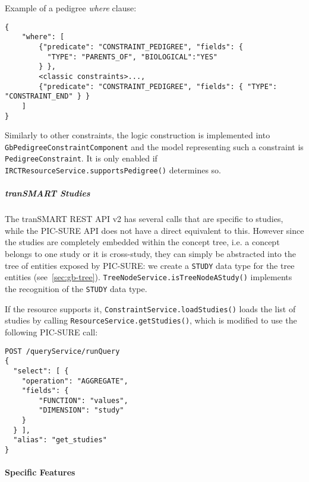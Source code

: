 Example of a pedigree \emph{where} clause:
\begin{verbatim}
{
    "where": [
        {"predicate": "CONSTRAINT_PEDIGREE", "fields": { 
          "TYPE": "PARENTS_OF", "BIOLOGICAL":"YES" 
        } },
        <classic constraints>..., 
        {"predicate": "CONSTRAINT_PEDIGREE", "fields": { "TYPE": "CONSTRAINT_END" } }
    ]
}
\end{verbatim}

Similarly to other constraints, the logic construction is implemented into \\
\verb|GbPedigreeConstraintComponent| and the model representing such a constraint is \verb|PedigreeConstraint|.
It is only enabled if \verb|IRCTResourceService.supportsPedigree()| determines so.


\subparagraph{tranSMART Studies}

The tranSMART REST API v2 has several calls that are specific to studies, while the PIC-SURE API does not have a direct equivalent to this.
However since the studies are completely embedded within the concept tree, i.e. a concept belongs to one study or it is cross-study, they can simply be abstracted into the tree of entities exposed by PIC-SURE: we create a \verb|STUDY| data type for the tree entities (see~\ref{sec:gb-tree}).
\verb|TreeNodeService.isTreeNodeAStudy()| implements the recognition of the \verb|STUDY| data type.

If the resource supports it, \verb|ConstraintService.loadStudies()| loads the list of studies by calling \verb|ResourceService.getStudies()|, which is modified to use the following PIC-SURE call:
\begin{verbatim}
POST /queryService/runQuery
{
  "select": [ {
    "operation": "AGGREGATE",
    "fields": {
        "FUNCTION": "values",
        "DIMENSION": "study"
    }
  } ],
  "alias": "get_studies"
}
\end{verbatim}


\paragraph{Specific Features}
\label{sec:specific-features}

